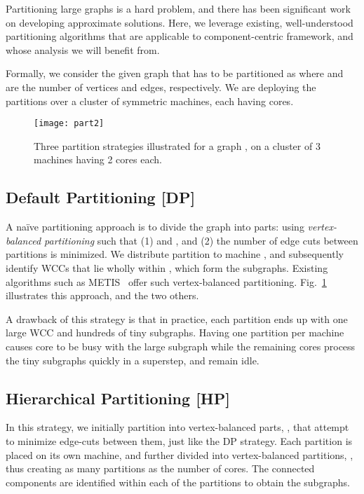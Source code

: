 \documentclass[10pt,conference, compsocconf]{IEEEtran}
\begin{document}
Partitioning large graphs is a hard problem, and there has been significant work on developing approximate solutions. Here, we leverage existing, well-understood partitioning algorithms that are applicable to component-centric framework, and whose analysis we will benefit from. 



Formally, we consider the given graph that has to be partitioned as  where  and  are the number of vertices and edges, respectively. We are deploying the partitions over a cluster of  symmetric machines, each having  cores. 




\begin{figure}[t]
\centering \texttt{[image: part2]}
\caption{Three partition strategies illustrated for a graph , on a cluster of 3 machines having 2 cores each.}
\label{fig:strategy}
\vspace{-0.1in}
\end{figure}
\subsection{Default Partitioning [DP]} 

A na\"{i}ve partitioning approach is to divide the graph  into  parts:     using \emph{vertex-balanced partitioning} such that (1)  and  , and (2) the number of edge cuts between partitions is minimized. We distribute partition  to machine , and subsequently identify WCCs that lie wholly within , which form the subgraphs. Existing algorithms such as METIS~\cite{metis} offer such vertex-balanced partitioning. Fig.~\ref{fig:strategy} illustrates this approach, and the two others.

A drawback of this strategy is that in practice, each partition ends up with one large WCC and hundreds of tiny subgraphs. Having one partition per machine causes  core to be busy with the large subgraph while the remaining  cores process the tiny subgraphs quickly in a superstep, and remain idle.

\subsection{Hierarchical Partitioning [HP]} In this strategy, we initially partition  into  vertex-balanced parts, , that attempt to minimize edge-cuts between them, just like the DP strategy. Each partition is placed on its own machine, and further divided into  vertex-balanced partitions, , thus creating as many partitions as the number of cores. The connected components are identified within each of the  partitions to obtain the subgraphs. 
\end{document}
